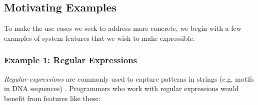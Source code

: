 \subsection{Motivating Examples}\label{sec:examples}
To make the use cases we seek to address more concrete, we begin with a few examples of system features that we wish to make expressible.

\subsubsection{Example 1: Regular Expressions}\label{sec:regex}
\emph{Regular expressions} are commonly used to capture patterns in strings (e.g. motifs in DNA sequences) \cite{Thompson:1968:PTR:363347.363387}. Programmers who work with regular expressions would benefit from features like these:

